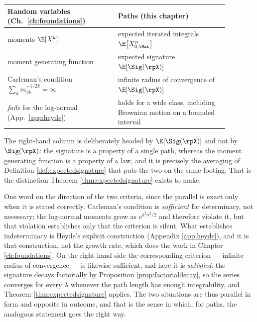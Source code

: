 \begin{center}
\begin{tabular}{@{}p{0.44\linewidth}p{0.44\linewidth}@{}}
\hline
\textbf{Random variables (Ch.\ \ref{ch:foundations})} & \textbf{Paths (this chapter)} \\
\hline
moments $\E[X^k]$ & expected iterated integrals $\E\bigl[X^n_{0,\Mat}\bigr]$ \\
moment generating function & expected signature $\E[\Sig(\rpX)]$ \\
Carleman's condition $\sum_k m_{2k}^{-1/2k}=\infty$ & infinite radius of convergence of $\E[\Sig(\rpX)]$ \\
\emph{fails} for the log-normal (App.\ \ref{app:heyde}) & holds for a wide class, including Brownian motion on a bounded interval \\
\hline
\end{tabular}
\end{center}

The right-hand column is deliberately headed by $\E[\Sig(\rpX)]$ and not by $\Sig(\rpX)$: the
signature is a property of a single path, whereas the moment generating function is a property of a
law, and it is precisely the averaging of Definition \ref{def:expectedsignature} that puts the two
on the same footing. That is the distinction Theorem \ref{thm:expectedsignature} exists to make.

One word on the direction of the two criteria, since the parallel is exact only when it is stated
correctly. Carleman's condition is \emph{sufficient} for determinacy, not necessary; the log-normal
moments grow as $e^{k^2\sigma^2/2}$ and therefore violate it, but that violation establishes only
that the criterion is silent. What establishes indeterminacy is Heyde's explicit construction
(Appendix \ref{app:heyde}), and it is that construction, not the growth rate, which does the work in
Chapter \ref{ch:foundations}. On the right-hand side the corresponding criterion --- infinite radius
of convergence --- is likewise sufficient, and here it is \emph{satisfied}: the signature decays
factorially by Proposition \ref{prop:factorialdecay}, so the series converges for every $\lambda$
whenever the path length has enough integrability, and Theorem \ref{thm:expectedsignature} applies.
The two situations are thus parallel in form and opposite in outcome, and that is the sense in which,
for paths, the analogous statement goes the right way.

